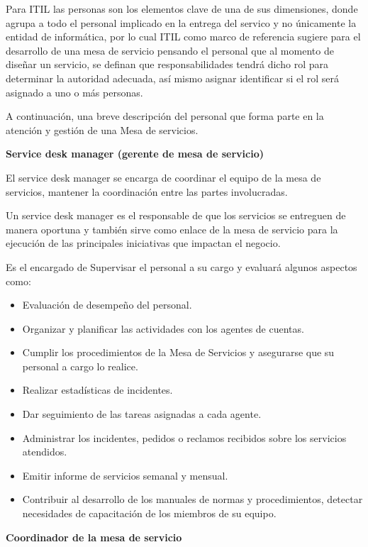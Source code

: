 Para ITIL las personas son los elementos clave de una de sus dimensiones, donde  agrupa a todo el personal implicado en la entrega del servico y no únicamente la entidad de informática, por lo cual ITIL como marco de referencia sugiere para el desarrollo de una mesa de servicio pensando el personal que al momento de diseñar un servicio, se definan que responsabilidades tendrá dicho rol para determinar la autoridad adecuada, así mismo asignar identificar si el rol será asignado a uno o más personas. 

A continuación, una breve descripción del personal que forma parte en la atención y gestión de una Mesa de servicios.

\textbf{Service desk manager (gerente de mesa de servicio)}



El service desk manager se encarga de coordinar el equipo de la mesa de servicios, mantener la coordinación entre las partes involucradas. 

Un service desk manager es el responsable de que los servicios se entreguen de manera oportuna y también sirve como enlace de la mesa de servicio para la ejecución de las principales iniciativas que impactan el negocio.

Es el encargado de Supervisar el personal a su cargo y evaluará algunos aspectos como:

\begin{itemize}
	\item 	Evaluación de desempeño del personal.
\item 		Organizar y planificar las actividades con los agentes de cuentas.
	\item 	Cumplir los procedimientos de la Mesa de Servicios y asegurarse que su personal a cargo lo realice.
\item 		Realizar estadísticas de incidentes.
\item 		Dar seguimiento de las tareas asignadas a cada agente.
\item 		Administrar los incidentes, pedidos o reclamos recibidos sobre los servicios atendidos.
\item 		Emitir informe de servicios semanal y mensual.
\item 		Contribuir al desarrollo de los manuales de normas y procedimientos, detectar necesidades de capacitación de los miembros de su equipo.
	
\end{itemize}

\textbf{Coordinador de la mesa de servicio}


